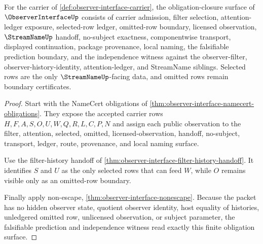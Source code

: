 \begin{theorem}
\label{thm:observer-interface-obligation-closure-package}
For the carrier of \autoref{def:observer-interface-carrier}, the obligation-closure surface of $\ObserverInterfaceUp$ consists of carrier admission, filter selection, attention-ledger exposure, selected-row ledger, omitted-row boundary, licensed observation, $\StreamNameUp$ handoff, no-subject exactness, componentwise transport, displayed continuation, package provenance, local naming, the falsifiable prediction boundary, and the independence witness against the observer-filter, observer-history-identity, attention-ledger, and StreamName siblings. Selected rows are the only $\StreamNameUp$-facing data, and omitted rows remain boundary certificates.
\end{theorem}
\begin{proof}
Start with the NameCert obligations of \autoref{thm:observer-interface-namecert-obligations}. They expose the accepted carrier rows $H,F,A,S,O,U,W,Q,R,L,C,P,N$ and assign each public observation to the filter, attention, selected, omitted, licensed-observation, handoff, no-subject, transport, ledger, route, provenance, and local naming surface.

Use the filter-history handoff of \autoref{thm:observer-interface-filter-history-handoff}. It identifies $S$ and $U$ as the only selected rows that can feed $W$, while $O$ remains visible only as an omitted-row boundary.

Finally apply non-escape, \autoref{thm:observer-interface-nonescape}. Because the packet has no hidden observer state, quotient observer identity, host equality of histories, unledgered omitted row, unlicensed observation, or subject parameter, the falsifiable prediction and independence witness read exactly this finite obligation surface.
\end{proof}

